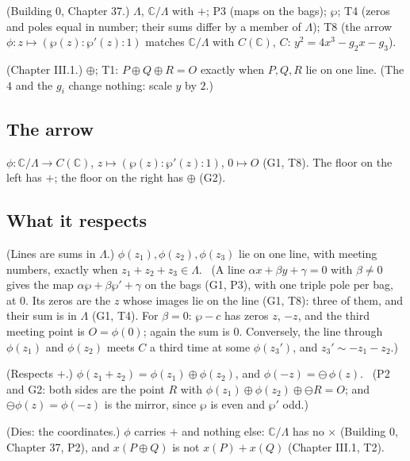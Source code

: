 \begin{lines}
\item[\lab{G1}] (Building 0, Chapter 37.) $\Lambda$, $\mathbb{C}/\Lambda$ with $+$; P3 (maps on the bags); $\wp$; T4 (zeros and poles equal in number; their sums differ by a member of $\Lambda$); T8 (the arrow $\phi : z \mapsto (\wp(z) : \wp'(z) : 1)$ matches $\mathbb{C}/\Lambda$ with $C(\mathbb{C})$, $C$: $y^2 = 4x^3 - g_2 x - g_3$).
\item[\lab{G2}] (Chapter III.1.) $\oplus$; T1: $P \oplus Q \oplus R = O$ exactly when $P, Q, R$ lie on one line. (The $4$ and the $g_i$ change nothing: scale $y$ by $2$.)
\end{lines}

\subsection*{The arrow}

\begin{lines}
\item[\lab{P1}] $\phi : \mathbb{C}/\Lambda \to C(\mathbb{C})$, $z \mapsto (\wp(z) : \wp'(z) : 1)$, $0 \mapsto O$ (G1, T8). The floor on the left has $+$; the floor on the right has $\oplus$ (G2).
\end{lines}

\subsection*{What it respects}

\begin{lines}
\item[\lab{P2}] (Lines are sums in $\Lambda$.) $\phi(z_1), \phi(z_2), \phi(z_3)$ lie on one line, with meeting numbers, exactly when $z_1 + z_2 + z_3 \in \Lambda$. \ (A line $\alpha x + \beta y + \gamma = 0$ with $\beta \ne 0$ gives the map $\alpha \wp + \beta \wp' + \gamma$ on the bags (G1, P3), with one triple pole per bag, at $0$. Its zeros are the $z$ whose images lie on the line (G1, T8): three of them, and their sum is in $\Lambda$ (G1, T4). For $\beta = 0$: $\wp - c$ has zeros $z$, $-z$, and the third meeting point is $O = \phi(0)$; again the sum is $0$. Conversely, the line through $\phi(z_1)$ and $\phi(z_2)$ meets $C$ a third time at some $\phi(z_3')$, and $z_3' \sim -z_1 - z_2$.)
\item[\lab{P3}] (Respects $+$.) $\phi(z_1 + z_2) = \phi(z_1) \oplus \phi(z_2)$, and $\phi(-z) = \ominus\,\phi(z)$. \ (P2 and G2: both sides are the point $R$ with $\phi(z_1) \oplus \phi(z_2) \oplus \ominus R = O$; and $\ominus \phi(z) = \phi(-z)$ is the mirror, since $\wp$ is even and $\wp'$ odd.)
\item[\lab{P4}] (Dies: the coordinates.) $\phi$ carries $+$ and nothing else: $\mathbb{C}/\Lambda$ has no $\times$ (Building 0, Chapter 37, P2), and $x(P \oplus Q)$ is not $x(P) + x(Q)$ (Chapter III.1, T2).
\end{lines}


